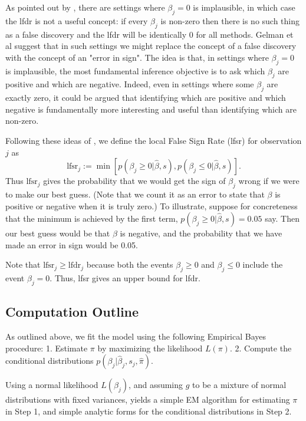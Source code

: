 \documentclass[10pt]{article}
\def\lfsr{\text{lfsr}}
\begin{document}
As pointed out by \cite{gelman.etal}, there are settings where
$\beta_j=0$ is implausible, in which case the lfdr is not
a useful concept: if every $\beta_j$ is non-zero then there
is no such thing as a false discovery and the lfdr will be identically 0 for all methods. 
Gelman et al suggest that in such settings we
might replace the concept of a false discovery with the
concept of an "error in sign". The idea is that, in settings where $\beta_j=0$ is implausible, the most fundamental
inference objective is to ask which $\beta_j$ are positive and which are negative. Indeed, even in settings where some
$\beta_j$ are exactly zero, it could be argued that identifying which are positive and which negative is
fundamentally more interesting and useful than identifying which are non-zero. 

Following these ideas of \cite{gelman.etal}, we define the local False Sign Rate (lfsr) for observation $j$ as 
\begin{equation}
\lfsr_j := \min[ p(\beta_j \geq 0| \hat\beta, s), p(\beta_j \leq 0| \hat\beta, s) ].
\end{equation}
Thus $\lfsr_j$ gives the probability that we would get the sign of $\beta_j$ wrong if we
were to make our best guess. (Note that we count it as an error to state that $\beta$ is positive or negative when it is truly zero.)
To illustrate, suppose for concreteness
that the minimum is achieved by the first term, $p(\beta_j \geq 0| \hat\beta, s)=0.05$ say. Then
our best guess would be that $\beta$ is negative, and the probability that we have
made an error in sign would be 0.05.

Note that $\text{lfsr}_j \geq \text{lfdr}_j$ 
because both the events $\beta_j \geq 0$
and $\beta_j \leq 0$ include the event $\beta_j=0$.
Thus, lfsr gives an upper bound for lfdr.






\subsection{Computation Outline}

As outlined above, we fit the model using the following Empirical Bayes procedure:
1. Estimate $\pi$ by maximizing the likelihood $L(\pi)$.
2. Compute the conditional distributions $p(\beta_j | \hat\beta_j, s_j, \hat\pi)$.

Using a normal likelihood $L(\beta_j)$, and assuming
$g$ to be a mixture of normal distributions with fixed variances, 
yields a simple EM algorithm
for estimating $\pi$ in Step 1, and simple analytic forms for the conditional
distributions in Step 2.
\end{document}
